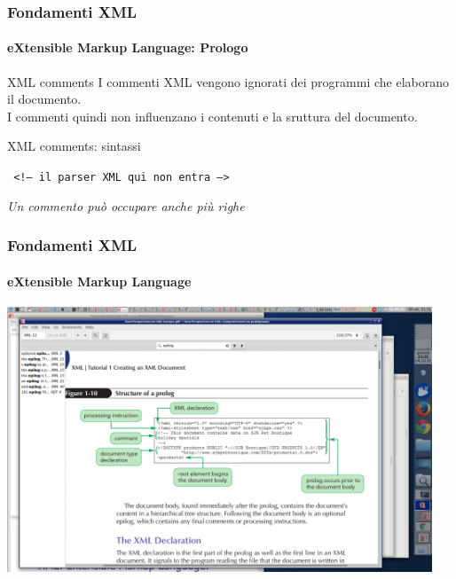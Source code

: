 \begin{frame}
	\frametitle{Fondamenti XML}
	\framesubtitle{eXtensible Markup Language: Prologo}
	\addtocounter{nframe}{1}

	\begin{block}{XML comments}
		I commenti XML vengono ignorati dei programmi che elaborano il documento.
		\\I commenti quindi non influenzano i contenuti e la sruttura del documento.
	\end{block}

	\begin{block}{XML comments: sintassi}
	\begin{center}\texttt{
		<!-- il parser XML qui non entra -->
	}\end{center}
	\end{block}

	\textit{Un commento può occupare anche più righe}
	
\end{frame}

\begin{frame}
	\frametitle{Fondamenti XML}
	\framesubtitle{eXtensible Markup Language}
	\addtocounter{nframe}{1}

	\begin{center}
		\includegraphics[width=0.95\textwidth]{imgs/XML-Prologo.png}
	\end{center}

\end{frame}

